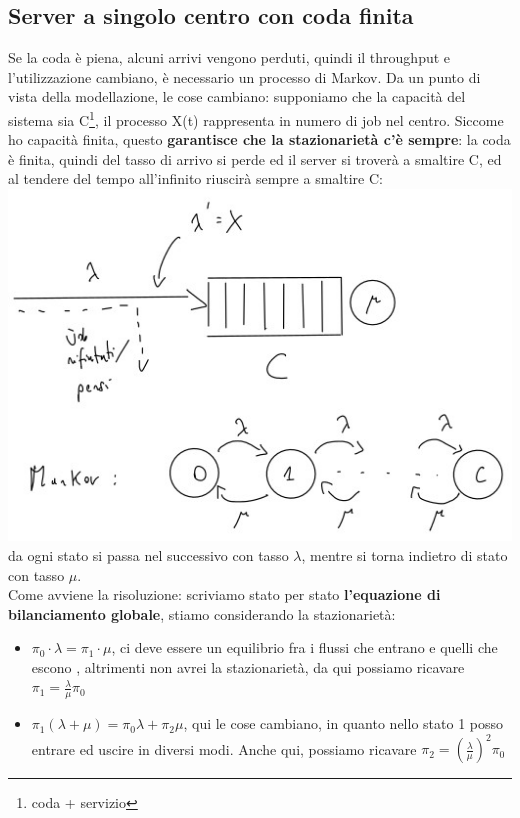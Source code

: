 \documentclass{article}
\begin{document}
\subsection{Server a singolo centro con coda finita}
Se la coda è piena, alcuni arrivi vengono perduti, quindi il throughput e l'utilizzazione cambiano, è necessario un processo di Markov. Da un punto di vista della modellazione, le cose cambiano: supponiamo che la capacità del sistema sia C\footnote{coda + servizio}, il processo X(t) rappresenta in numero di job nel centro. Siccome ho capacità finita, questo \textbf{garantisce che la stazionarietà c'è sempre}: la coda è finita, quindi del tasso di arrivo si perde ed il server si troverà a smaltire C, ed al tendere del tempo all'infinito riuscirà sempre a smaltire C:\\ 
\includegraphics[scale=0.5]{images/PMCSN-2403-2.jpeg}\\
da ogni stato si passa nel successivo con tasso $\lambda$, mentre si torna indietro di stato con tasso $\mu$.\\ Come avviene la risoluzione: scriviamo stato per stato \textbf{l'equazione di bilanciamento globale}, stiamo considerando la stazionarietà:
\begin{itemize}
\item $\pi_0 \cdot \lambda = \pi_1 \cdot \mu$, ci deve essere un equilibrio fra i flussi che entrano e quelli che escono , altrimenti non avrei la stazionarietà, da qui possiamo ricavare $\pi_1 = \frac{\lambda}{\mu}\pi_0$
\item $\pi_1(\lambda + \mu) = \pi_0 \lambda + \pi_2 \mu$, qui le cose cambiano, in quanto nello stato 1 posso entrare ed uscire in diversi modi. Anche qui, possiamo ricavare $\pi_2 = (\frac{\lambda}{\mu})^2 \pi_0$
\end{itemize}
\end{document}
